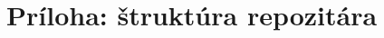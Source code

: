 \documentclass[11pt,a4paper]{article}
\begin{document}




\appendix
\section{Príloha: štruktúra repozitára}

\end{document}
